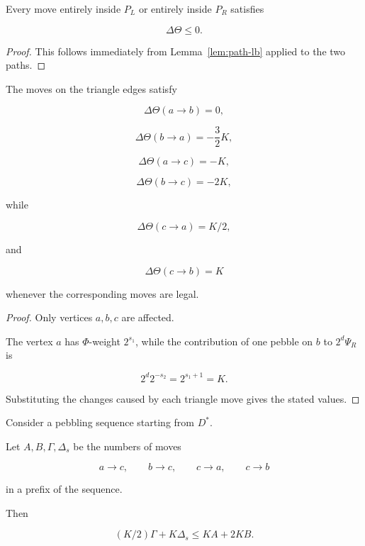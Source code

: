 \begin{lemma}
\label{lem:theta-offtriangle}

Every move entirely inside $P_L$ or entirely inside $P_R$ satisfies

\[
\Delta\Theta\le0 .
\]

\end{lemma}


\begin{proof}

This follows immediately from Lemma~\ref{lem:path-lb} applied to the two paths.

\end{proof}



\begin{lemma}
\label{lem:theta-triangle}

The moves on the triangle edges satisfy

\[
\Delta\Theta(a\to b)=0,
\]

\[
\Delta\Theta(b\to a)=-\frac32K,
\]

\[
\Delta\Theta(a\to c)=-K,
\]

\[
\Delta\Theta(b\to c)=-2K,
\]

while

\[
\Delta\Theta(c\to a)=K/2,
\]

and

\[
\Delta\Theta(c\to b)=K
\]

whenever the corresponding moves are legal.

\end{lemma}



\begin{proof}

Only vertices $a,b,c$ are affected.

The vertex $a$ has $\Phi$-weight $2^{s_1}$,
while the contribution of one pebble on $b$ to
$2^d\Psi_R$ is

\[
2^d2^{-s_2}=2^{s_1+1}=K .
\]

Substituting the changes caused by each triangle move gives the stated
values.

\end{proof}



\begin{lemma}
\label{lem:apex-resource}

Consider a pebbling sequence starting from $D^*$.

Let $A,B,\Gamma,\Delta_s$ be the numbers of moves

\[
a\to c,\qquad b\to c,\qquad c\to a,\qquad c\to b
\]

in a prefix of the sequence.

Then

\[
(K/2)\Gamma+K\Delta_s
\le
KA+2KB .
\]

\end{lemma}



